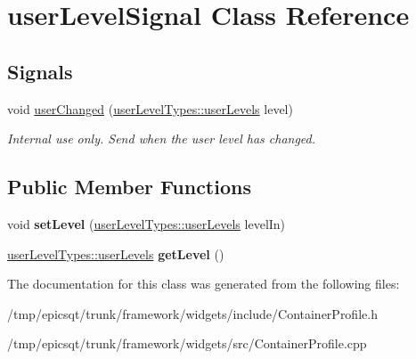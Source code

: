 \hypertarget{classuserLevelSignal}{
\section{userLevelSignal Class Reference}
\label{classuserLevelSignal}
}
\subsection*{Signals}
\begin{DoxyCompactItemize}
\item 
\hypertarget{classuserLevelSignal_aab9ec46eb07ef06bdcd9818793326683}{
void \hyperlink{classuserLevelSignal_aab9ec46eb07ef06bdcd9818793326683}{userChanged} (\hyperlink{classuserLevelTypes_a033cf2a40f620286b1839dd360c8497b}{userLevelTypes::userLevels} level)}
\label{classuserLevelSignal_aab9ec46eb07ef06bdcd9818793326683}

\begin{DoxyCompactList}\small\item\em Internal use only. Send when the user level has changed. \end{DoxyCompactList}\end{DoxyCompactItemize}
\subsection*{Public Member Functions}
\begin{DoxyCompactItemize}
\item 
\hypertarget{classuserLevelSignal_a0f3e1f293720e6470ae1eb630f2ebaa6}{
void {\bfseries setLevel} (\hyperlink{classuserLevelTypes_a033cf2a40f620286b1839dd360c8497b}{userLevelTypes::userLevels} levelIn)}
\label{classuserLevelSignal_a0f3e1f293720e6470ae1eb630f2ebaa6}

\item 
\hypertarget{classuserLevelSignal_ac09af689f3ed0c6f224162c713819edf}{
\hyperlink{classuserLevelTypes_a033cf2a40f620286b1839dd360c8497b}{userLevelTypes::userLevels} {\bfseries getLevel} ()}
\label{classuserLevelSignal_ac09af689f3ed0c6f224162c713819edf}

\end{DoxyCompactItemize}


The documentation for this class was generated from the following files:\begin{DoxyCompactItemize}
\item 
/tmp/epicsqt/trunk/framework/widgets/include/ContainerProfile.h\item 
/tmp/epicsqt/trunk/framework/widgets/src/ContainerProfile.cpp\end{DoxyCompactItemize}

